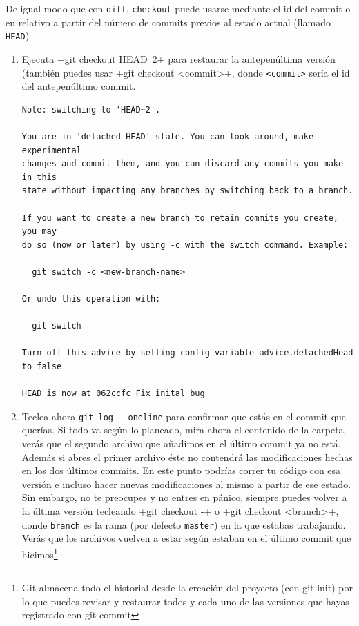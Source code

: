 \documentclass[a5paper, oneside,10pt]{article}
\begin{document}
    De igual modo que con \verb+diff+, \verb+checkout+ puede usarse mediante el id del commit o en relativo a partir del número de commits previos al estado actual (llamado \verb+HEAD+)\
    \begin{enumerate}
      \item Ejecuta \cverb+git checkout HEAD~2+ para restaurar la antepenúltima versión (también puedes usar \cverb+git checkout <commit>+, donde \verb+<commit>+ sería el id del antepenúltimo commit.
      
      \begin{lstlisting}[style=custom]
Note: switching to 'HEAD~2'.

You are in 'detached HEAD' state. You can look around, make experimental
changes and commit them, and you can discard any commits you make in this
state without impacting any branches by switching back to a branch.

If you want to create a new branch to retain commits you create, you may
do so (now or later) by using -c with the switch command. Example:

  git switch -c <new-branch-name>

Or undo this operation with:

  git switch -

Turn off this advice by setting config variable advice.detachedHead to false

HEAD is now at 062ccfc Fix inital bug
    \end{lstlisting}
      
    \item Teclea ahora \verb+git log --oneline+ para confirmar que estás en el commit que querías. Si todo va según lo planeado, mira ahora el contenido de la carpeta, verás que el segundo archivo que añadimos en el último commit ya no está. Además si abres el primer archivo éste no contendrá las modificaciones hechas en los dos últimos commits. En este punto podrías correr tu código con esa versión e incluso hacer nuevas modificaciones al mismo a partir de ese estado. Sin embargo, no te preocupes y no entres en pánico, siempre puedes volver a la última versión tecleando \cverb+git checkout -+ o \cverb+git checkout <branch>+, donde \verb+branch+ es la rama (por defecto \verb+master+) en la que estabas trabajando. Verás que los archivos vuelven a estar según estaban en el último commit que hicimos\footnote{Git almacena todo el historial desde la creación del proyecto (con git init) por lo que puedes revisar y restaurar todos y cada uno de las versiones que hayas registrado con git commit}.


\end{enumerate}
\end{document}
